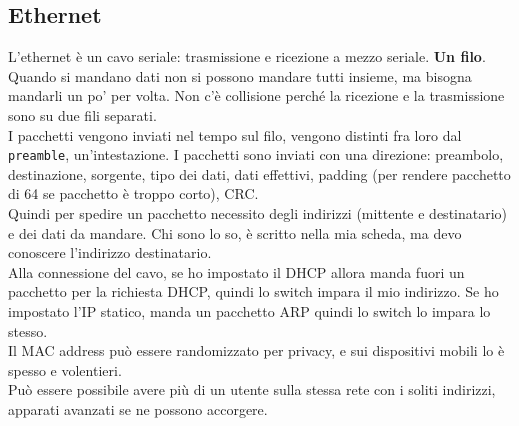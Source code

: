 \documentclass[10pt]{book}
\begin{document}
\subsection{Ethernet}
L'ethernet è un cavo seriale: trasmissione e ricezione a mezzo seriale. \textbf{Un filo}.\\
Quando si mandano dati non si possono mandare tutti insieme, ma bisogna mandarli un po' per volta. Non c'è collisione perché la ricezione e la trasmissione sono su due fili separati.\\
I pacchetti vengono inviati nel tempo sul filo, vengono distinti fra loro dal \texttt{preamble}, un'intestazione. I pacchetti sono inviati con una direzione: preambolo, destinazione, sorgente, tipo dei dati, dati effettivi, padding (per rendere pacchetto di 64 se pacchetto è troppo corto), CRC.\\
Quindi per spedire un pacchetto necessito degli indirizzi (mittente e destinatario) e dei dati da mandare. Chi sono lo so, è scritto nella mia scheda, ma devo conoscere l'indirizzo destinatario.\\
Alla connessione del cavo, se ho impostato il DHCP allora manda fuori un pacchetto per la richiesta DHCP, quindi lo switch impara il mio indirizzo. Se ho impostato l'IP statico, manda un pacchetto ARP quindi lo switch lo impara lo stesso.\\
Il MAC address può essere randomizzato per privacy, e sui dispositivi mobili lo è spesso e volentieri.\\
Può essere possibile avere più di un utente sulla stessa rete con i soliti indirizzi, apparati avanzati se ne possono accorgere.
\end{document}
